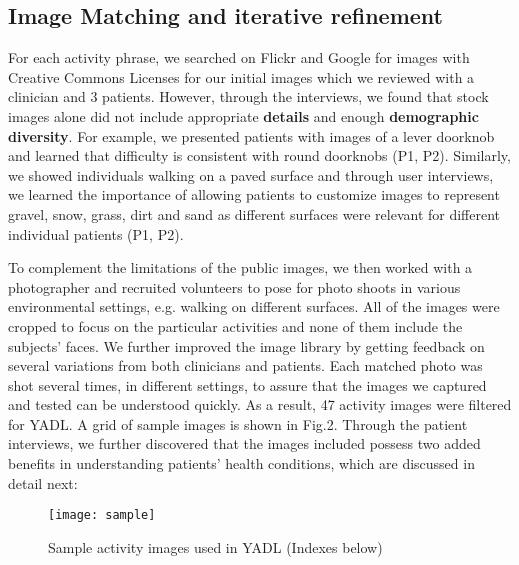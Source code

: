 \documentclass{sig-alternate-05-2015}
\begin{document}
\subsection{Image Matching and iterative refinement}

For each activity phrase, we searched on Flickr and Google for images with Creative Commons Licenses for our initial images which we reviewed with a clinician and 3 patients. However, through the interviews, we found that stock images alone did not include appropriate \textbf{details} and enough \textbf{demographic diversity}. For example, we presented patients with images of a lever doorknob and learned that difficulty is consistent with round doorknobs (P1, P2). Similarly, we showed individuals walking on a paved surface and through user interviews, we learned the importance of allowing patients to customize images to represent gravel, snow, grass, dirt and sand as different surfaces were relevant for different individual patients (P1, P2). 

To complement the limitations of the public images, we then worked with a photographer and recruited volunteers to pose for photo shoots in various environmental settings, e.g. walking on different surfaces. All of the images were cropped to focus on the particular activities and none of them include the subjects' faces. We further improved the image library by getting feedback on several variations from both clinicians and patients. Each matched photo was shot several times, in different settings, to assure that the images we captured and tested can be understood quickly. As a result, 47 activity images were filtered for YADL. A grid of sample images is shown in Fig.2. Through the patient interviews, we further discovered that the images included possess two added benefits in understanding patients' health conditions, which are discussed in detail next: 

\begin{figure}
\centering
  \texttt{[image: sample]}
  \caption{Sample activity images used in YADL (Indexes below)
}
\label{fig:sample}
\vspace{-3mm}
\end{figure}
\end{document}
